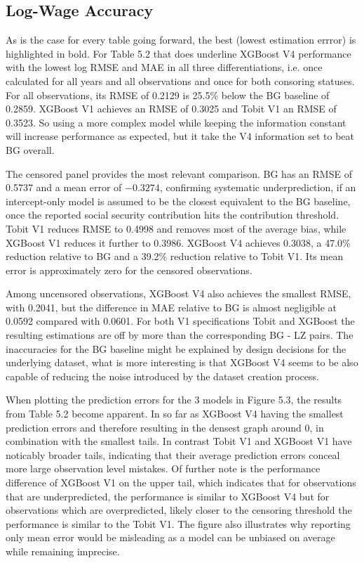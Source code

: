 \documentclass[12pt,a4paper,oneside,titlepage]{book}
\begin{document}
\subsection{Log-Wage Accuracy}
As is the case for every table going forward, the best (lowest estimation errror) is highlighted in bold. For Table 5.2 that does underline XGBoost V4 performance with the lowest log RMSE and MAE in all three differentiations, i.e. once calculated for all years and all observations and once for both consoring statuses.
For all observations, its RMSE of 0.2129 is 25.5\% below the BG baseline of 0.2859. XGBoost V1 achieves an RMSE of 0.3025 and Tobit V1 an RMSE of 0.3523. So using a more complex model while keeping the information constant will increase performance as expected, but it take the V4 information set to beat BG overall.

The censored panel provides the most relevant comparison. BG has an RMSE of 0.5737 and a mean error of $-0.3274$, confirming systematic underprediction, if an intercept-only model is assumed to be the closest equivalent to the BG baseline, once the reported social security contribution hits the contribution threshold. Tobit V1 reduces RMSE to 0.4998 and removes most of the average bias, while XGBoost V1 reduces it further to 0.3986. XGBoost V4 achieves 0.3038, a 47.0\% reduction relative to BG and a 39.2\% reduction relative to Tobit V1. Its mean error is approximately zero for the censored observations.

Among uncensored observations, XGBoost V4 also achieves the smallest RMSE, with 0.2041, but the difference in MAE relative to BG is almost negligible at 0.0592 compared with 0.0601. For both V1 specifications Tobit and XGBoost the resulting estimations are off by more than the corresponding BG - LZ pairs. The inaccuracies for the BG baseline might be explained by design decisions for the underlying dataset, what is more interesting is that XGBoost V4 seems to be also capable of reducing the noise introduced by the dataset creation process.



\newpage
When plotting the prediction errors for the 3 models in Figure 5.3, the results from Table 5.2 become apparent. In so far as XGBoost V4 having the smallest prediction errors and therefore resulting in the densest graph around 0, in combination with the smallest tails. In contrast Tobit V1 and XGBoost V1 have noticably broader tails, indicating that their average prediction errors conceal more large observation level mistakes. Of further note is the performance difference of XGBoost V1 on the upper tail, which indicates that for observations that are underpredicted, the performance is similar to XGBoost V4 but for observations which are overpredicted, likely closer to the censoring threshold the performance is similar to the Tobit V1. The figure also illustrates why reporting only mean error would be misleading as a model can be unbiased on average while remaining imprecise.
\end{document}
